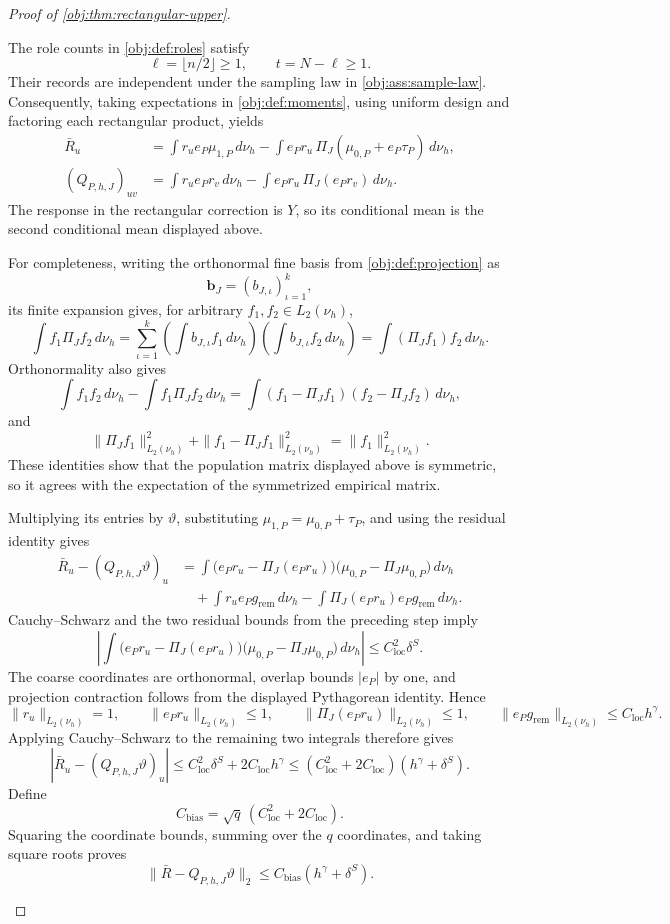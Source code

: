 \begin{proof}[Proof of \cref{obj:thm:rectangular-upper}]
\begin{enumerate}
The role counts in \cref{obj:def:roles} satisfy
\[
\ell=\lfloor n/2\rfloor\ge1,\qquad
t=N-\ell\ge1.
\]
Their records are independent under the sampling law in
\cref{obj:ass:sample-law}. Consequently, taking expectations in
\cref{obj:def:moments}, using uniform design and factoring each rectangular product, yields
\[
\begin{aligned}
\bar R_u
&=\int r_u e_P\mu_{1,P}\,d\nu_h
 -\int e_Pr_u\,\Pi_J(\mu_{0,P}+e_P\tau_P)\,d\nu_h,\\
(Q_{P,h,J})_{uv}
&=\int r_u e_Pr_v\,d\nu_h
 -\int e_Pr_u\,\Pi_J(e_Pr_v)\,d\nu_h.
\end{aligned}
\]
The response in the rectangular correction is \(Y\), so its conditional mean is the second conditional mean displayed above.

For completeness, writing the orthonormal fine basis from
\cref{obj:def:projection} as
\[
\mathbf b_J=(b_{J,\iota})_{\iota=1}^k,
\]
its finite expansion gives, for arbitrary
\(f_1,f_2\in L_2(\nu_h)\),
\[
\int f_1\Pi_Jf_2\,d\nu_h
=
\sum_{\iota=1}^k
 \left(\int b_{J,\iota} f_1\,d\nu_h\right)
 \left(\int b_{J,\iota} f_2\,d\nu_h\right)
=
\int (\Pi_Jf_1)f_2\,d\nu_h.
\]
Orthonormality also gives
\[
\int f_1f_2\,d\nu_h-\int f_1\Pi_Jf_2\,d\nu_h
=
\int(f_1-\Pi_Jf_1)(f_2-\Pi_Jf_2)\,d\nu_h,
\]
and
\[
\|\Pi_Jf_1\|_{L_2(\nu_h)}^2
+\|f_1-\Pi_Jf_1\|_{L_2(\nu_h)}^2
=\|f_1\|_{L_2(\nu_h)}^2.
\]
These identities show that the population matrix displayed above is symmetric, so it agrees with the expectation of the symmetrized empirical matrix.

Multiplying its entries by \(\vartheta\), substituting
\(\mu_{1,P}=\mu_{0,P}+\tau_P\), and using the residual identity gives
\[
\begin{aligned}
\bar R_u-(Q_{P,h,J}\vartheta)_u
&=\int
 \bigl(e_Pr_u-\Pi_J(e_Pr_u)\bigr)
 \bigl(\mu_{0,P}-\Pi_J\mu_{0,P}\bigr)\,d\nu_h\\
&\quad+\int r_u e_Pg_{\mathrm{rem}}\,d\nu_h
 -\int \Pi_J(e_Pr_u)e_Pg_{\mathrm{rem}}\,d\nu_h.
\end{aligned}
\]
Cauchy--Schwarz and the two residual bounds from the preceding step imply
\[
\left|\int
 \bigl(e_Pr_u-\Pi_J(e_Pr_u)\bigr)
 \bigl(\mu_{0,P}-\Pi_J\mu_{0,P}\bigr)\,d\nu_h\right|
\le C_{\mathrm{loc}}^2\delta^S.
\]
The coarse coordinates are orthonormal, overlap bounds \(|e_P|\) by one, and projection contraction follows from the displayed Pythagorean identity. Hence
\[
\|r_u\|_{L_2(\nu_h)}=1,\qquad
\|e_Pr_u\|_{L_2(\nu_h)}\le1,\qquad
\|\Pi_J(e_Pr_u)\|_{L_2(\nu_h)}\le1,\qquad
\|e_Pg_{\mathrm{rem}}\|_{L_2(\nu_h)}
 \le C_{\mathrm{loc}}h^\gamma.
\]
Applying Cauchy--Schwarz to the remaining two integrals therefore gives
\[
|\bar R_u-(Q_{P,h,J}\vartheta)_u|
\le C_{\mathrm{loc}}^2\delta^S+2C_{\mathrm{loc}}h^\gamma
\le
(C_{\mathrm{loc}}^2+2C_{\mathrm{loc}})
(h^\gamma+\delta^S).
\]
Define
\[
C_{\mathrm{bias}}
=\sqrt q\,(C_{\mathrm{loc}}^2+2C_{\mathrm{loc}}).
\]
Squaring the coordinate bounds, summing over the \(q\) coordinates, and taking square roots proves
\[
\|\bar R-Q_{P,h,J}\vartheta\|_2
\le C_{\mathrm{bias}}(h^\gamma+\delta^S).
\]%


\end{enumerate}
\end{proof}
